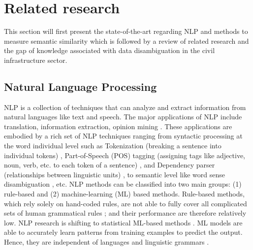 \documentclass[Journal, InsideFigs, DoubleSpace]{ascelike} %
\begin{document}
\section{Related research} \label{sec:litrev} %
This section will first present the state-of-the-art regarding NLP and methods to measure semantic similarity which is followed by a review of related research and the gap of knowledge associated with data disambiguation in the civil infrastructure sector.
%
\subsection{Natural Language Processing}
NLP is a collection of techniques that can analyze and extract information from natural languages like text and speech. The major applications of NLP include translation, information extraction, opinion mining \cite{Cambria14}. These applications are embodied by a rich set of NLP techniques ranging from syntactic  processing at the word individual level such as Tokenization (breaking a sentence into individual tokens) \cite{Webster92,Zhao11},  Part-of-Speech (POS) tagging (assigning tags like adjective, noun, verb, etc. to each token of a sentence) \cite{Toutanova03,Cunningham02}, and Dependency parser (relationships between linguistic units) \cite{chen14},  to semantic level like word sense disambiguation \cite{Lesk86,Yarowsky95,Navigli09}, etc. NLP methods can be classified into two main groups: (1) rule-based and (2) machine-learning (ML) based methods. Rule-based methods, which rely solely on hand-coded rules, are not able to fully cover all complicated sets of human grammatical rules \cite{Marcus95}; and their performance are therefore relatively low. NLP research is shifting to statistical ML-based methods \cite{Cambria14}. ML models are able to accurately learn patterns from training examples to predict the output. Hence, they are independent of languages and linguistic grammars \cite{costa-jussa12}.
%
\end{document}
